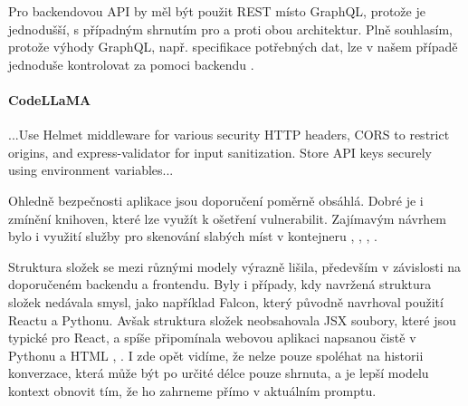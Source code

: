\documentclass[FM,DP]{tulthesis}
\begin{document}
		Pro backendovou API by měl být použit REST místo GraphQL, protože je jednodušší, s případným shrnutím pro a proti obou architektur. Plně souhlasím, protože výhody GraphQL, např. specifikace potřebných dat, lze v našem případě jednoduše kontrolovat za pomoci backendu \cite{REST_GQL}.
		
		\vspace{0.6em}
		\vspace{0.6em}
		\begin{tcolorbox}[colback=white,colframe=black]
			\paragraph{CodeLLaMA}
			...Use Helmet middleware for various security HTTP headers, CORS to restrict origins, and express-validator for input sanitization. Store API keys securely using environment variables... \cite{claude_navrh}
		\end{tcolorbox}
		\vspace{0.6em}
		
		Ohledně bezpečnosti aplikace jsou doporučení poměrně obsáhlá. Dobré je i zmínění knihoven, které lze využít k ošetření vulnerabilit. Zajímavým návrhem bylo i využití služby pro skenování slabých míst v kontejneru \cite{claude_navrh}, \cite{security_headers}, \cite{docker-docs}, \cite{ibm:containers}.
		
		Struktura složek se mezi různými modely výrazně lišila, především v závislosti na doporučeném backendu a frontendu. Byly i případy, kdy navržená struktura složek nedávala smysl, jako například Falcon, který původně navrhoval použití Reactu a Pythonu. Avšak struktura složek neobsahovala JSX soubory, které jsou typické pro React, a spíše připomínala webovou aplikaci napsanou čistě v Pythonu a HTML \cite{falcon_navrh}, \cite{react}. I zde opět vidíme, že nelze pouze spoléhat na historii konverzace, která může být po určité délce pouze shrnuta, a je lepší modelu kontext obnovit tím, že ho zahrneme přímo v aktuálním promptu.
		
\end{document}
